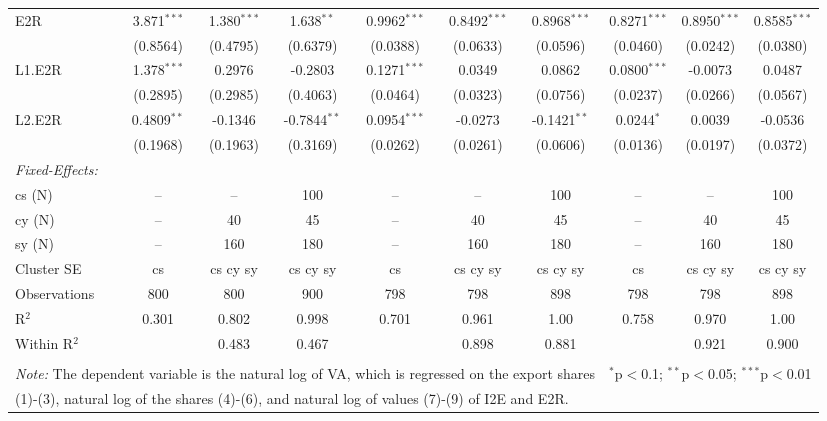 \documentclass[a4paper]{article}
\begin{document}
\begin{table}[h!]
{\begin{tabular}[t]{lccccccccc}
E2R&3.871$^{***}$ & 1.380$^{***}$ & 1.638$^{**}$ & 0.9962$^{***}$ & 0.8492$^{***}$ & 0.8968$^{***}$ & 0.8271$^{***}$ & 0.8950$^{***}$ & 0.8585$^{***}$\\
  &(0.8564) & (0.4795) & (0.6379) & (0.0388) & (0.0633) & (0.0596) & (0.0460) & (0.0242) & (0.0380)\\%
L1.E2R&1.378$^{***}$ & 0.2976 & -0.2803 & 0.1271$^{***}$ & 0.0349 & 0.0862 & 0.0800$^{***}$ & -0.0073 & 0.0487\\
  &(0.2895) & (0.2985) & (0.4063) & (0.0464) & (0.0323) & (0.0756) & (0.0237) & (0.0266) & (0.0567)\\%
L2.E2R&0.4809$^{**}$ & -0.1346 & -0.7844$^{**}$ & 0.0954$^{***}$ & -0.0273 & -0.1421$^{**}$ & 0.0244$^{*}$ & 0.0039 & -0.0536\\
  &(0.1968) & (0.1963) & (0.3169) & (0.0262) & (0.0261) & (0.0606) & (0.0136) & (0.0197) & (0.0372)\\%
\midrule \emph{Fixed-Effects:} &   &   &   &   &   &  \\
cs (N) & -- & -- & 100 & -- & -- & 100 & -- & -- & 100\\
cy (N) & -- & 40 & 45 & -- & 40 & 45 & -- & 40 & 45\\
sy (N) & -- & 160 & 180 & -- & 160 & 180 & -- & 160 & 180\\
\midrule
Cluster SE & cs & cs cy sy & cs cy sy & cs & cs cy sy & cs cy sy & cs & cs cy sy & cs cy sy\\
Observations & 800&800&900&798&798&898&798&798&898\\
R$^2$ & 0.301&0.802&0.998&0.701&0.961&1.00&0.758&0.970&1.00\\
Within R$^2$ & &0.483&0.467&&0.898&0.881&&0.921&0.900\\ \bottomrule \\[-1em]
\multicolumn{7}{l}{\small \textit{Note:} The dependent variable is the natural log of VA, which is regressed on the  export shares}   & \multicolumn{3}{r}{$^{*}$p$<$0.1; $^{**}$p$<$0.05; $^{***}$p$<$0.01} \\ [-0.2em]
\multicolumn{10}{l}{\small \quad \quad \quad (1)-(3), natural log of the shares (4)-(6), and natural log of values (7)-(9) of I2E and E2R.} \\
\end{tabular}
}
\end{table}
\FloatBarrier
\end{document}
